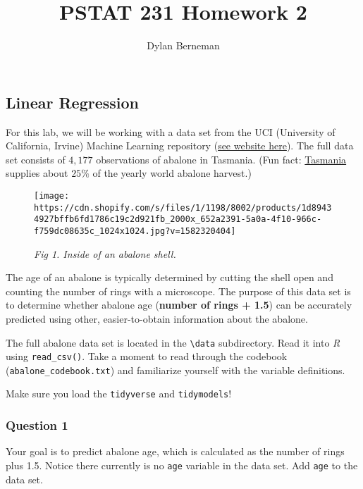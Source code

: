 \documentclass[
]{article}
\title{PSTAT 231 Homework 2}
\author{Dylan Berneman}
\date{}
\begin{document}
\maketitle

{
\setcounter{tocdepth}{2}
\tableofcontents
}
\hypertarget{linear-regression}{%
\subsection{Linear Regression}\label{linear-regression}}

For this lab, we will be working with a data set from the UCI
(University of California, Irvine) Machine Learning repository
(\href{http://archive.ics.uci.edu/ml/datasets/Abalone}{see website
here}). The full data set consists of \(4,177\) observations of abalone
in Tasmania. (Fun fact:
\href{https://en.wikipedia.org/wiki/Tasmania}{Tasmania} supplies about
\(25\%\) of the yearly world abalone harvest.)

\begin{figure}
\centering
\texttt{[image: https://cdn.shopify.com/s/files/1/1198/8002/products/1d89434927bffb6fd1786c19c2d921fb\_2000x\_652a2391-5a0a-4f10-966c-f759dc08635c\_1024x1024.jpg?v=1582320404]}
\caption{\emph{Fig 1. Inside of an abalone shell.}}
\end{figure}

The age of an abalone is typically determined by cutting the shell open
and counting the number of rings with a microscope. The purpose of this
data set is to determine whether abalone age (\textbf{number of rings +
1.5}) can be accurately predicted using other, easier-to-obtain
information about the abalone.

The full abalone data set is located in the
\texttt{\textbackslash{}data} subdirectory. Read it into \emph{R} using
\texttt{read\_csv()}. Take a moment to read through the codebook
(\texttt{abalone\_codebook.txt}) and familiarize yourself with the
variable definitions.

Make sure you load the \texttt{tidyverse} and \texttt{tidymodels}!

\hypertarget{question-1}{%
\subsubsection{Question 1}\label{question-1}}

Your goal is to predict abalone age, which is calculated as the number
of rings plus 1.5. Notice there currently is no \texttt{age} variable in
the data set. Add \texttt{age} to the data set.
\end{document}
